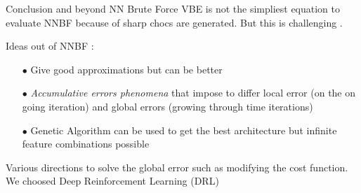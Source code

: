 \documentclass[10pt,
			   xcolor=svgnames,
			   hyperref={linkcolor=red, citecolor = DarkGreen, colorlinks=true, urlcolor=Navy}]{beamer}
\newcommand\bk{\color{black}}
\newcommand\navy{\color{navy}}
\newcommand\red{\color{red}}
\begin{document}
\begin{frame}{Conclusion and beyond NN Brute Force}
VBE is not the simpliest equation to evaluate NNBF because of sharp chocs are generated. But this is \navy challenging \bk. \\
 
	\begin{block}{Ideas out of NNBF :}	
		\begin{itemize}
			\item[$\bullet$] Give good approximations but can be better
			\item[$\bullet$] \textit{Accumulative errors phenomena} that impose to differ \red local \bk error (on the on going iteration) and \red global \bk errors (growing through time iterations)
			\item[$\bullet$] Genetic Algorithm can be used to get the best architecture but \red infinite \bk feature combinations possible\\[0.5cm]
		\end{itemize}
	\end{block}
\vspace{3mm}
Various directions to solve the global error such as modifying the cost function. \red We choosed Deep Reinforcement Learning (DRL)\bk

\end{frame}
\end{document}
